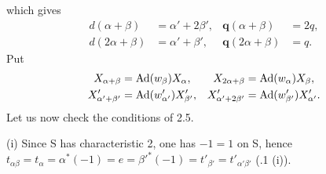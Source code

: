 which gives
\[
\begin{aligned}
d(\alpha+\beta)&=\alpha'+2\beta',&\mathbf q(\alpha+\beta)&=2q,\\
d(2\alpha+\beta)&=\alpha'+\beta',&\mathbf q(2\alpha+\beta)&=q.
\end{aligned}
\]
Put
\[
\begin{aligned}
X_{\alpha+\beta}&=\operatorname{Ad}(w_\beta)X_\alpha,&X_{2\alpha+\beta}&=\operatorname{Ad}(w_\alpha)X_\beta,\\
X'_{\alpha'+\beta'}&=\operatorname{Ad}(w'_{\alpha'})X'_{\beta'},&X'_{\alpha'+2\beta'}&=\operatorname{Ad}(w'_{\beta'})X'_{\alpha'}.
\end{aligned}
\]
Let us now check the conditions of 2.5.

(i) Since S has characteristic 2, one has $-1=1$ on S, hence $t_{\alpha\beta}=t_\alpha=\alpha^*(-1)=e=\beta'^*(-1)=t'_{\beta'}=t'_{\alpha'\beta'}$ (.1 (i)).

